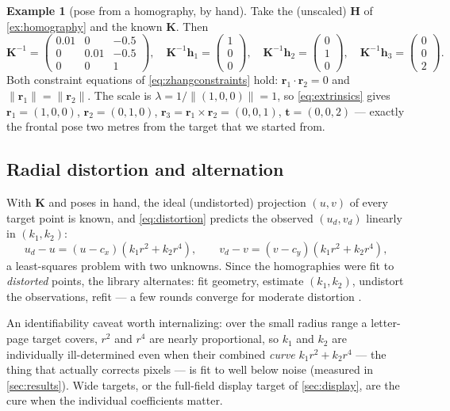 \documentclass[11pt]{article}
\theoremstyle{definition}
\newtheorem{example}{Example}
\newcommand{\mat}[1]{\mathbf{#1}}
\newcommand{\vect}[1]{\mathbf{#1}}
\newcommand{\K}{\mat{K}}
\newcommand{\Hm}{\mat{H}}
\newcommand{\tv}{\vect{t}}
\begin{document}
\begin{example}[pose from a homography, by hand]
\label{ex:zhang}
Take the (unscaled) $\Hm$ of \autoref{ex:homography} and the known
$\K$. Then
\[
\K^{-1}=\begin{pmatrix}0.01&0&-0.5\\0&0.01&-0.5\\0&0&1\end{pmatrix},\quad
\K^{-1}\vect h_1=\begin{pmatrix}1\\0\\0\end{pmatrix},\quad
\K^{-1}\vect h_2=\begin{pmatrix}0\\1\\0\end{pmatrix},\quad
\K^{-1}\vect h_3=\begin{pmatrix}0\\0\\2\end{pmatrix}.
\]
Both constraint equations of \eqref{eq:zhangconstraints} hold:
$\vect r_1\cdot\vect r_2 = 0$ and $\|\vect r_1\|=\|\vect r_2\|$. The scale
is $\lambda=1/\|(1,0,0)\|=1$, so \eqref{eq:extrinsics} gives
$\vect r_1=(1,0,0)$, $\vect r_2=(0,1,0)$,
$\vect r_3=\vect r_1\times\vect r_2=(0,0,1)$, $\tv=(0,0,2)$ --- exactly the
frontal pose two metres from the target that we started from.
\end{example}

\subsection{Radial distortion and alternation}
\label{sec:radial}

With $\K$ and poses in hand, the ideal (undistorted) projection $(u,v)$ of
every target point is known, and \eqref{eq:distortion} predicts the observed
$(u_d,v_d)$ linearly in $(k_1,k_2)$:
\begin{equation}
u_d-u=(u-c_x)(k_1r^2+k_2r^4),\qquad
v_d-v=(v-c_y)(k_1r^2+k_2r^4),
\label{eq:radiallin}
\end{equation}
a least-squares problem with two unknowns. Since the homographies were fit
to \emph{distorted} points, the library alternates: fit geometry, estimate
$(k_1,k_2)$, undistort the observations, refit --- a few rounds converge for
moderate distortion \cite{Zhang2000}.

An identifiability caveat worth internalizing: over the small radius range a
letter-page target covers, $r^2$ and $r^4$ are nearly proportional, so
$k_1$ and $k_2$ are individually ill-determined even when their combined
\emph{curve} $k_1r^2{+}k_2r^4$ --- the thing that actually corrects pixels
--- is fit to well below noise (measured in \autoref{sec:results}). Wide
targets, or the full-field display target of \autoref{sec:display}, are the
cure when the individual coefficients matter.
\end{document}
